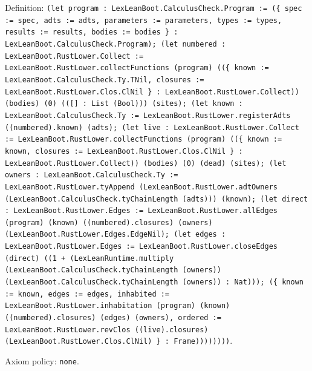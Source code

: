\documentclass[11pt]{article}
\begin{document}
\noindent Definition: \texttt{(let program : LexLeanBoot.CalculusCheck.Program := (\{ spec := spec, adts := adts, parameters := parameters, types := types, results := results, bodies := bodies \} : LexLeanBoot.CalculusCheck.Program); (let numbered : LexLeanBoot.RustLower.Collect := LexLeanBoot.RustLower.collectFunctions (program) ((\{ known := LexLeanBoot.CalculusCheck.Ty.TNil, closures := LexLeanBoot.RustLower.Clos.ClNil \} : LexLeanBoot.RustLower.Collect)) (bodies) (0) (([] : List (Bool))) (sites); (let known : LexLeanBoot.CalculusCheck.Ty := LexLeanBoot.RustLower.registerAdts ((numbered).known) (adts); (let live : LexLeanBoot.RustLower.Collect := LexLeanBoot.RustLower.collectFunctions (program) ((\{ known := known, closures := LexLeanBoot.RustLower.Clos.ClNil \} : LexLeanBoot.RustLower.Collect)) (bodies) (0) (dead) (sites); (let owners : LexLeanBoot.CalculusCheck.Ty := LexLeanBoot.RustLower.tyAppend (LexLeanBoot.RustLower.adtOwners (LexLeanBoot.CalculusCheck.tyChainLength (adts))) (known); (let direct : LexLeanBoot.RustLower.Edges := LexLeanBoot.RustLower.allEdges (program) (known) ((numbered).closures) (owners) (LexLeanBoot.RustLower.Edges.EdgeNil); (let edges : LexLeanBoot.RustLower.Edges := LexLeanBoot.RustLower.closeEdges (direct) ((1 + (LexLeanRuntime.multiply (LexLeanBoot.CalculusCheck.tyChainLength (owners)) (LexLeanBoot.CalculusCheck.tyChainLength (owners)) : Nat))); (\{ known := known, edges := edges, inhabited := LexLeanBoot.RustLower.inhabitation (program) (known) ((numbered).closures) (edges) (owners), ordered := LexLeanBoot.RustLower.revClos ((live).closures) (LexLeanBoot.RustLower.Clos.ClNil) \} : Frame))))))))}.\par
\noindent Axiom policy: \texttt{none}.\par
\end{document}

